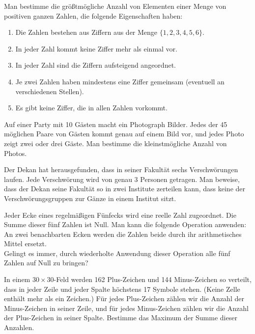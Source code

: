 \documentclass{bw06}
\begin{document}
\begin{problems}
\item Man bestimme die gr{\"o}{\ss}tm{\"o}gliche Anzahl von Elementen einer
Menge von positiven ganzen Zahlen, die folgende Eigenschaften
haben:
\begin{enumerate}
\item Die Zahlen bestehen aus Ziffern aus der Menge
$\{1,2,3,4,5,6\}$. \item In jeder Zahl kommt keine Ziffer mehr als
einmal vor. \item In jeder Zahl sind die Ziffern aufsteigend
angeordnet. \item Je zwei Zahlen haben mindestens eine Ziffer
gemeinsam (eventuell an verschiedenen Stellen). \item Es gibt
keine Ziffer, die in allen Zahlen vorkommt.
\end{enumerate}

\item Auf einer Party mit 10 G{\"a}sten macht ein Photograph Bilder.
Jedes der 45 m{\"o}glichen Paare von G{\"a}sten kommt genau auf einem Bild
vor, und jedes Photo zeigt zwei oder drei G{\"a}ste. Man bestimme die
kleinstm{\"o}gliche Anzahl von Photos.

\item Der Dekan hat herausgefunden, dass in seiner Fakult{\"a}t sechs
Verschw{\"o}rungen laufen. Jede Verschw{\"o}rung wird von genau 3 Personen
getragen. Man beweise, dass der Dekan seine Fakult{\"a}t so in zwei
Institute zerteilen kann, dass keine der Verschw{\"o}rungsgruppen zur
G{\"a}nze in einem Institut sitzt.

\item Jeder Ecke eines regelm{\"a}{\ss}igen F{\"u}nfecks wird eine reelle Zahl
zugeordnet. Die Summe dieser f{\"u}nf Zahlen ist Null. Man kann die
folgende Operation anwenden: An zwei benachbarten Ecken werden
die Zahlen beide durch ihr arithmetisches Mittel ersetzt. \\
Gelingt es immer, durch wiederholte Anwendung dieser Operation
alle f{\"u}nf Zahlen auf Null zu bringen?

\item In einem $30\times 30$-Feld werden 162 Plus-Zeichen und 144
Minus-Zeichen so verteilt, dass in jeder Zeile und jeder Spalte
h{\"o}chstens 17 Symbole stehen. (Keine Zelle enth{\"a}lt mehr als ein
Zeichen.) F{\"u}r jedes Plus-Zeichen z{\"a}hlen wir die Anzahl der
Minus-Zeichen in seiner Zeile, und f{\"u}r jedes Minus-Zeichen z{\"a}hlen
wir die Anzahl der Plus-Zeichen in seiner Spalte. Bestimme das
Maximum der Summe dieser Anzahlen.


\end{problems}
\end{document}
